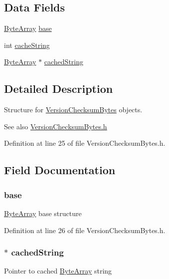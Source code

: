 \subsection*{Data Fields}
\begin{DoxyCompactItemize}
\item 
\hyperlink{struct_byte_array}{ByteArray} \hyperlink{struct_version_checksum_bytes_a403d3e7fd73c70aa24590627ed54844e}{base}
\item 
int \hyperlink{struct_version_checksum_bytes_a440754891ba48c34d0ec933efc36e050}{cacheString}
\item 
\hyperlink{struct_byte_array}{ByteArray} $\ast$ \hyperlink{struct_version_checksum_bytes_a25e4ea0f9f3ce1cce55f374afbba99c6}{cachedString}
\end{DoxyCompactItemize}


\subsection{Detailed Description}
Structure for \hyperlink{struct_version_checksum_bytes}{VersionChecksumBytes} objects. 

\begin{DoxySeeAlso}{See also}
\hyperlink{_version_checksum_bytes_8h}{VersionChecksumBytes.h} 
\end{DoxySeeAlso}


Definition at line 25 of file VersionChecksumBytes.h.



\subsection{Field Documentation}
\hypertarget{struct_version_checksum_bytes_a403d3e7fd73c70aa24590627ed54844e}{
\subsubsection[{base}]{ {\bf base}}}
\label{struct_version_checksum_bytes_a403d3e7fd73c70aa24590627ed54844e}
\hyperlink{struct_byte_array}{ByteArray} base structure 

Definition at line 26 of file VersionChecksumBytes.h.

\hypertarget{struct_version_checksum_bytes_a25e4ea0f9f3ce1cce55f374afbba99c6}{
\subsubsection[{cachedString}]{$\ast$ {\bf cachedString}}}
\label{struct_version_checksum_bytes_a25e4ea0f9f3ce1cce55f374afbba99c6}
Pointer to cached \hyperlink{struct_byte_array}{ByteArray} string 

